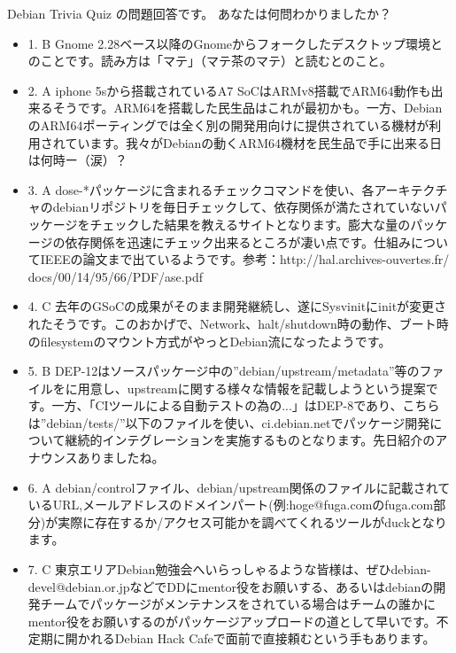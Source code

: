\documentclass[mingoth,a4paper]{jsarticle}
\begin{document}
 Debian Trivia Quiz の問題回答です。
 あなたは何問わかりましたか？ \\
 \begin{itemize}
 \item
1. B Gnome 2.28ベース以降のGnomeからフォークしたデスクトップ環境とのことです。読み方は「マテ」（マテ茶のマテ）と読むとのこと。
\item
2. A iphone 5sから搭載されているA7 SoCはARMv8搭載でARM64動作も出来るそうです。ARM64を搭載した民生品はこれが最初かも。一方、DebianのARM64ポーティングでは全く別の開発用向けに提供されている機材が利用されています。我々がDebianの動くARM64機材を民生品で手に出来る日は何時ー（涙）？
\item
3. A dose-*パッケージに含まれるチェックコマンドを使い、各アーキテクチャのdebianリポジトリを毎日チェックして、依存関係が満たされていないパッケージをチェックした結果を教えるサイトとなります。膨大な量のパッケージの依存関係を迅速にチェック出来るところが凄い点です。仕組みについてIEEEの論文まで出ているようです。参考：http://hal.archives-ouvertes.fr/ docs/00/14/95/66/PDF/ase.pdf
\item
4. C 去年のGSoCの成果がそのまま開発継続し、遂にSysvinitにinitが変更されたそうです。このおかげで、Network、halt/shutdown時の動作、ブート時のfilesystemのマウント方式がやっとDebian流になったようです。
\item
5. B DEP-12はソースパッケージ中の''debian/upstream/metadata''等のファイルをに用意し、upstreamに関する様々な情報を記載しようという提案です。一方、「CIツールによる自動テストの為の...」はDEP-8であり、こちらは''debian/tests/''以下のファイルを使い、ci.debian.netでパッケージ開発について継続的インテグレーションを実施するものとなります。先日紹介のアナウンスありましたね。
\item
6. A debian/controlファイル、debian/upstream関係のファイルに記載されているURL,メールアドレスのドメインパート(例:hoge@fuga.comのfuga.com部分)が実際に存在するか/アクセス可能かを調べてくれるツールがduckとなります。
\item
7. C 東京エリアDebian勉強会へいらっしゃるような皆様は、ぜひdebian-devel@debian.or.jpなどでDDにmentor役をお願いする、あるいはdebianの開発チームでパッケージがメンテナンスをされている場合はチームの誰かにmentor役をお願いするのがパッケージアップロードの道として早いです。不定期に開かれるDebian Hack Cafeで面前で直接頼むという手もあります。

\end{itemize}
\end{document}
